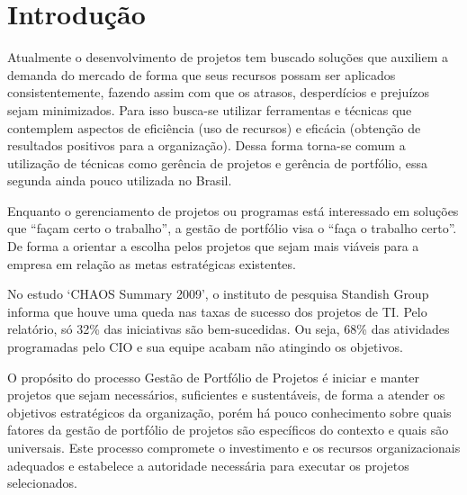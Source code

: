 \documentclass[12pt,a4paper,ruledheader,tocpage=prefix,floatnumber=continuous,pagestart=folhaderosto,font=times]{abnt}
\begin{document}















\listadefiguras
\cleardoublepage 
\listadetabelas
\cleardoublepage


\tableofcontents

\chapter{Introdução}
Atualmente o desenvolvimento de projetos tem buscado soluções que auxiliem a demanda do mercado de forma que seus recursos possam ser aplicados
consistentemente, fazendo assim com que os atrasos, desperdícios e prejuízos sejam minimizados. Para isso busca-se utilizar ferramentas e 
técnicas que contemplem aspectos de eficiência (uso de recursos) e eficácia (obtenção de resultados positivos para a organização).
Dessa forma torna-se comum a utilização de técnicas como gerência de projetos e gerência de portfólio, essa segunda ainda pouco utilizada no Brasil.

Enquanto o gerenciamento de projetos ou programas está interessado em soluções que ``façam certo o trabalho'', a gestão de portfólio visa o ``faça o 
trabalho certo''.\cite{sppm} De forma a orientar a escolha pelos projetos que sejam mais viáveis para a empresa em relação as metas estratégicas 
existentes. 

No estudo ‘CHAOS Summary 2009’, o instituto de pesquisa Standish Group informa que houve uma queda nas taxas de sucesso dos projetos de TI. Pelo 
relatório, só 32\% das iniciativas são bem-sucedidas. Ou seja, 68\% das atividades programadas pelo CIO e sua equipe acabam não atingindo os objetivos.

O propósito do processo Gestão de Portfólio de Projetos é iniciar e manter projetos que sejam necessários, suficientes e sustentáveis, de forma a 
atender os objetivos estratégicos da organização, porém há pouco conhecimento sobre quais fatores da gestão de portfólio de projetos são específicos do 
contexto e quais são universais. Este processo compromete o investimento e os recursos organizacionais adequados e estabelece a autoridade necessária 
para executar os projetos selecionados.\cite{mps}
\end{document}
